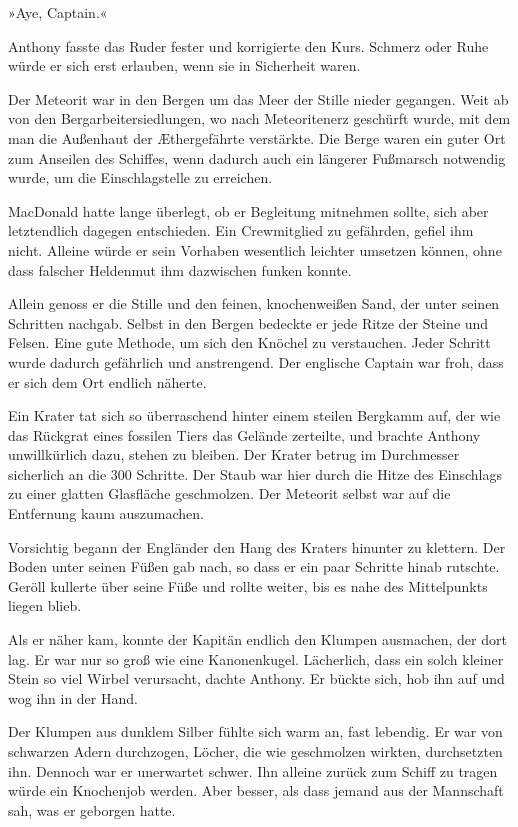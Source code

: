 »Aye, Captain.«

Anthony fasste das Ruder fester und korrigierte den Kurs. Schmerz
oder Ruhe würde er sich erst erlauben, wenn sie in Sicherheit
waren.

\tb

Der Meteorit war in den Bergen um das Meer der Stille nieder
gegangen. Weit ab von den Bergarbeitersiedlungen, wo nach
Meteoritenerz geschürft wurde, mit dem man die Außenhaut der
Æthergefährte verstärkte. Die Berge waren ein guter Ort zum
Anseilen des Schiffes, wenn dadurch auch ein längerer Fußmarsch
notwendig wurde, um die Einschlagstelle zu erreichen.

MacDonald hatte lange überlegt, ob er Begleitung mitnehmen sollte,
sich aber letztendlich dagegen entschieden. Ein Crewmitglied zu
gefährden, gefiel ihm nicht. Alleine würde er sein Vorhaben
wesentlich leichter umsetzen können, ohne dass falscher Heldenmut
ihm dazwischen funken konnte.

Allein genoss er die Stille und den feinen, knochenweißen Sand, der
unter seinen Schritten nachgab. Selbst in den Bergen bedeckte er
jede Ritze der Steine und Felsen. Eine gute Methode, um sich den
Knöchel zu verstauchen. Jeder Schritt wurde dadurch gefährlich und
anstrengend. Der englische Captain war froh, dass er sich dem Ort
endlich näherte.

Ein Krater tat sich so überraschend hinter einem steilen Bergkamm
auf, der wie das Rückgrat eines fossilen Tiers das Gelände
zerteilte, und brachte Anthony unwillkürlich dazu, stehen zu
bleiben. Der Krater betrug im Durchmesser sicherlich an die 300
Schritte. Der Staub war hier durch die Hitze des Einschlags zu
einer glatten Glasfläche geschmolzen. Der Meteorit selbst war auf
die Entfernung kaum auszumachen.

Vorsichtig begann der Engländer den Hang des Kraters hinunter zu
klettern. Der Boden unter seinen Füßen gab nach, so dass er ein
paar Schritte hinab rutschte. Geröll kullerte über seine Füße und
rollte weiter, bis es nahe des Mittelpunkts liegen blieb.

Als er näher kam, konnte der Kapitän endlich den Klumpen ausmachen,
der dort lag. Er war nur so groß wie eine Kanonenkugel. Lächerlich,
dass ein solch kleiner Stein so viel Wirbel verursacht, dachte
Anthony. Er bückte sich, hob ihn auf und wog ihn in der Hand.

Der Klumpen aus dunklem Silber fühlte sich warm an, fast lebendig.
Er war von schwarzen Adern durchzogen, Löcher, die wie geschmolzen
wirkten, durchsetzten ihn. Dennoch war er unerwartet schwer. Ihn
alleine zurück zum Schiff zu tragen würde ein Knochenjob werden.
Aber besser, als dass jemand aus der Mannschaft sah, was er
geborgen hatte.

